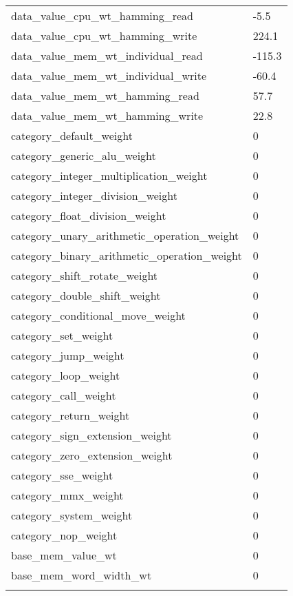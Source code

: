 \begin{longtable}{l|l}
  data\_value\_cpu\_wt\_hamming\_read & -5.5 \\
  data\_value\_cpu\_wt\_hamming\_write & 224.1 \\

  data\_value\_mem\_wt\_individual\_read & -115.3 \\
  data\_value\_mem\_wt\_individual\_write & -60.4 \\

  data\_value\_mem\_wt\_hamming\_read & 57.7 \\
  data\_value\_mem\_wt\_hamming\_write & 22.8 \\

  category\_default\_weight & 0 \\
  category\_generic\_alu\_weight & 0 \\
  category\_integer\_multiplication\_weight & 0 \\
  category\_integer\_division\_weight & 0 \\
  category\_float\_division\_weight & 0 \\
  category\_unary\_arithmetic\_operation\_weight & 0 \\
  category\_binary\_arithmetic\_operation\_weight & 0 \\
  category\_shift\_rotate\_weight & 0 \\
  category\_double\_shift\_weight & 0 \\
  category\_conditional\_move\_weight & 0 \\
  category\_set\_weight & 0 \\
  category\_jump\_weight & 0 \\
  category\_loop\_weight & 0 \\
  category\_call\_weight & 0 \\
  category\_return\_weight & 0 \\
  category\_sign\_extension\_weight & 0 \\
  category\_zero\_extension\_weight & 0 \\
  category\_sse\_weight & 0 \\
  category\_mmx\_weight & 0 \\
  category\_system\_weight & 0 \\
  category\_nop\_weight & 0 \\

  base\_mem\_value\_wt & 0 \\
  base\_mem\_word\_width\_wt & 0 \\

  \hline \\

\end{longtable}
